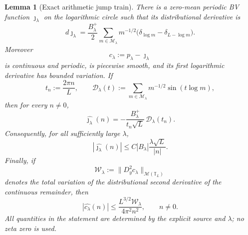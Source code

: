 \documentclass[11pt]{article}
\newtheorem{lemma}[theorem]{Lemma}
\theoremstyle{remark}
\begin{document}
\begin{lemma}[Exact arithmetic jump train]\label{lem:g1-jump-train}
There is a zero-mean periodic BV function $\jmath_\lambda$ on the logarithmic
circle such that its distributional derivative is
\begin{equation}\label{eq:g1-jump-measure}
 d\jmath_\lambda
 =\frac{B_\lambda^{+}}2
 \sum_{m\in\mathcal M_\lambda}m^{-1/2}
 \bigl(\delta_{\log m}-\delta_{L-\log m}\bigr).
\end{equation}
Moreover
\[
 c_\lambda:=p_\lambda-\jmath_\lambda
\]
is continuous and periodic, is piecewise smooth, and its first logarithmic
derivative has bounded variation.  If
\[
 t_n:=\frac{2\pi n}{L},\qquad
 \mathcal D_\lambda(t):=
 \sum_{m\in\mathcal M_\lambda}m^{-1/2}\sin(t\log m),
\]
then for every $n\ne0$,
\begin{equation}\label{eq:g1-jump-fourier-exact}
 \boxed{
 \widehat{\jmath_\lambda}(n)
 =-\frac{B_\lambda^{+}}{t_n\sqrt L}\,
 \mathcal D_\lambda(t_n).}
\end{equation}
Consequently, for all sufficiently large $\lambda$,
\begin{equation}\label{eq:g1-jump-fourier-trivial}
 \boxed{
 |\widehat{\jmath_\lambda}(n)|
 \le C|B_\lambda|\frac{\lambda\sqrt L}{|n|}.}
\end{equation}
Finally, if
\[
 \mathcal W_\lambda
 :=\bigl\|D_y^2c_\lambda\bigr\|_{\mathcal M(\mathbb T_L)}
\]
denotes the total variation of the distributional second derivative of the
continuous remainder, then
\begin{equation}\label{eq:g1-continuous-fourier}
 \boxed{
 |\widehat{c_\lambda}(n)|
 \le \frac{L^{3/2}\mathcal W_\lambda}{4\pi^2n^2},
 \qquad n\ne0.}
\end{equation}
All quantities in the statement are determined by the explicit source and
$\lambda$; no zeta zero is used.
\end{lemma}
\end{document}
